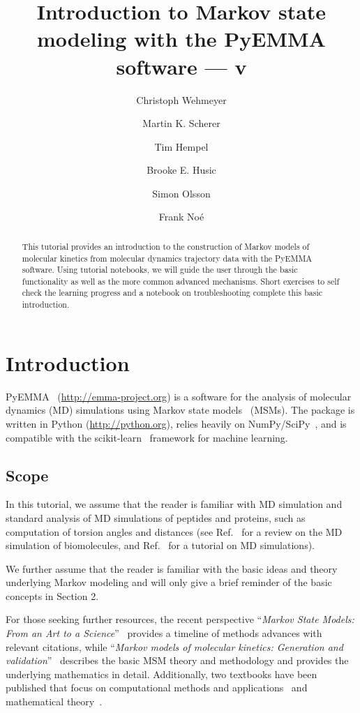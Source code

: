 \documentclass[9pt,tutorial]{livecoms}
\title{Introduction to Markov state modeling with the PyEMMA software --- v\versionnumber}
\author[1\authfn{1}*]{Christoph Wehmeyer}
\author[1\authfn{1}]{Martin K. Scherer}
\author[1\authfn{1}]{Tim Hempel}
\author[2]{Brooke E. Husic}
\author[1]{Simon Olsson}
\author[1*]{Frank Noé}
\affil[1]{Department of Mathematics and Computer Science, Freie Universität Berlin, Arnimallee 6, 14195 Berlin, Germany}
\affil[2]{Department of Chemistry, Stanford University, 333 Campus Drive, Stanford, California 94305, USA}
\begin{document}
\begin{frontmatter}
\maketitle

\begin{abstract}
This tutorial provides an introduction to the construction of Markov models of molecular kinetics from molecular dynamics trajectory data with the PyEMMA software.
Using tutorial notebooks, we will guide the user through the basic functionality as well as the more common advanced mechanisms.
Short exercises to self check the learning progress and a notebook on troubleshooting complete this basic introduction.
\end{abstract}

\end{frontmatter}

\section{Introduction}

PyEMMA~\cite{pyemma} (\url{http://emma-project.org}) is a software for the analysis of molecular dynamics (MD) simulations using Markov state models~\cite{schuette-msm,singhal-msm-naming,noe2007jcp,chodera2007jcp,buchete-msm-2008} (MSMs).
The package is written in Python (\url{http://python.org}), relies heavily on NumPy/SciPy~\cite{numpy,scipy}, and is compatible with the scikit-learn~\cite{sklearn} framework for machine learning.

\subsection{Scope}

In this tutorial, we assume that the reader is familiar with MD simulation and standard analysis of MD simulations of peptides and proteins, such as computation of torsion angles and distances (see Ref.~\cite{dror2012biomolecular} for a review on the MD simulation of biomolecules, and Ref.~\cite{mdtutorial} for a tutorial on MD simulations).

We further assume that the reader is familiar with the basic ideas and theory underlying Markov modeling and will only give a brief reminder of the basic concepts in Section 2.

For those seeking further resources, the recent perspective ``\emph{Markov State Models: From an Art to a Science}''~\cite{msm-brooke} provides a timeline of methods advances with relevant citations,
while ``\emph{Markov models of molecular kinetics: Generation and validation}''~\cite{msm-jhp} describes the basic MSM theory and methodology and provides the underlying mathematics in detail.
Additionally, two textbooks have been published that focus on computational methods and applications~\cite{msm-book} and mathematical theory~\cite{schuette-sarich-book}.
\end{document}
